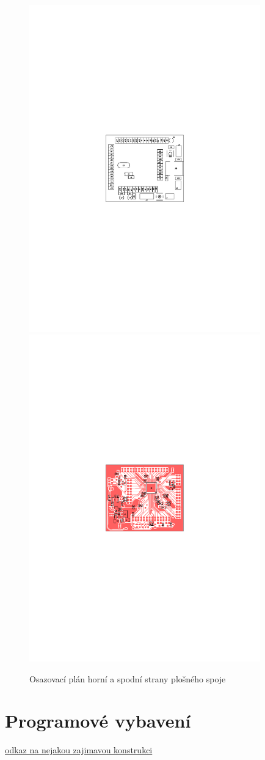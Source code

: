 \documentclass[12pt,a4paper,oneside]{article}
\begin{document}
\begin{figure} [h!tbp]
  \centering
  \includegraphics[trim = 6.5cm 11.5cm 6.5cm 11.5cm, clip, width=10cm]{../../CAM_DOC/O1.pdf}
  \includegraphics[trim = 6.5cm 11.5cm 6.5cm 11.5cm, clip, width=10cm]{../../CAM_DOC/O2.pdf}
  \caption{Osazovací plán horní a spodní strany plošného spoje}
  \label{fig:osazovaci_plan}
\end{figure}


\section{Programové vybavení}


\begin{thebibliography}{99}
\href{http:// odkaz na nejakou zajimavou konstrukci}{odkaz na nejakou zajimavou konstrukci}

\end{thebibliography}
\end{document}
